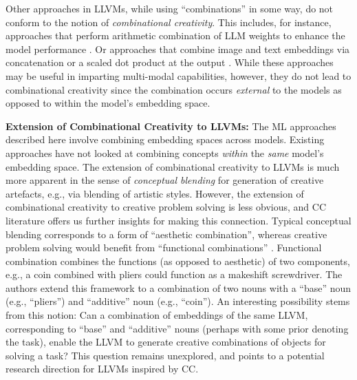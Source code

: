 Other approaches in LLVMs, while using ``combinations'' in some way, do not conform to the notion of \textit{combinational creativity}. This includes, for instance, approaches that perform arithmetic combination of LLM weights to enhance the model performance \cite{matena2022merging, ilharco2022editing}. Or approaches that combine image and text embeddings via concatenation \cite{kim2021vilt} or a scaled dot product at the output \cite{radford2021learning}. While these approaches may be useful in imparting multi-modal capabilities, however, they do not lead to combinational creativity since the combination occurs \textit{external} to the models as opposed to within the model's embedding space.
 
\textbf{Extension of Combinational Creativity to LLVMs:} The ML approaches described here involve combining embedding spaces across models. Existing approaches have not looked at combining concepts \textit{within} the \textit{same} model's embedding space. The extension of combinational creativity to LLVMs is much more apparent in the sense of \textit{conceptual blending} \cite{fauconnier2003conceptual} for generation of creative artefacts, e.g., via blending of artistic styles. However, the extension of combinational creativity to creative problem solving is less obvious, and CC literature offers us further insights for making this connection. Typical conceptual blending corresponds to a form of ``aesthetic combination'', whereas creative problem solving would benefit from ``functional combinations'' \cite{chen2018computational}. Functional combination combines the functions (as opposed to aesthetic) of two components, e.g., a coin combined with pliers could function as a makeshift screwdriver. The authors extend this framework to a combination of two nouns with a ``base'' noun (e.g., ``pliers'') and ``additive'' noun (e.g., ``coin''). An interesting possibility stems from this notion: Can a combination of embeddings of the same LLVM, corresponding to ``base'' and ``additive'' nouns (perhaps with some prior denoting the task), enable the LLVM to generate creative combinations of objects for solving a task? This question remains unexplored, and points to a potential research direction for LLVMs inspired by CC.


